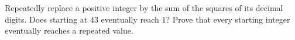 Repeatedly replace a positive integer by the sum of the squares of its decimal digits. Does starting at $43$ eventually reach $1$? Prove that every starting integer eventually reaches a repeated value.
